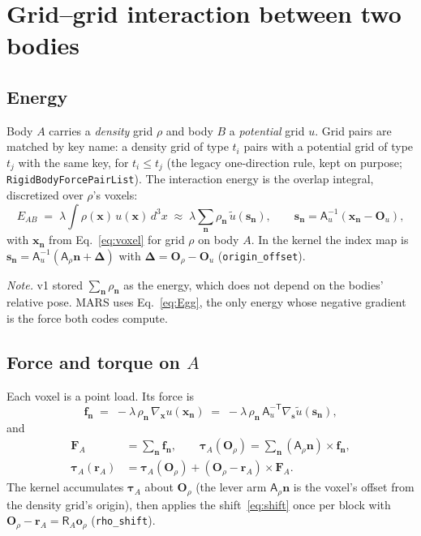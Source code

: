 \documentclass[11pt]{article}
\newcommand{\vb}[1]{\bm{#1}}
\newcommand{\code}[1]{\texttt{#1}}
\begin{document}
\section{Grid--grid interaction between two bodies}
\label{sec:gridgrid}

\subsection{Energy}

Body $A$ carries a \emph{density} grid $\rho$ and body $B$ a \emph{potential}
grid $u$. Grid pairs are matched by key name: a density grid of type $t_i$
pairs with a potential grid of type $t_j$ with the same key, for $t_i\le t_j$
(the legacy one-direction rule, kept on purpose; \code{RigidBodyForcePairList}).
The interaction energy is the overlap integral, discretized over $\rho$'s
voxels:
\begin{equation}
  E_{AB} \;=\; \lambda\int \rho(\vb x)\,u(\vb x)\,d^3x
  \;\approx\; \lambda\sum_{\vb n}\rho_{\vb n}\,
  \tilde u\!\left(\vb s_{\vb n}\right),
  \qquad
  \vb s_{\vb n} = \mathsf A_u^{-1}\!\left(\vb x_{\vb n}-\vb O_u\right),
  \label{eq:Egg}
\end{equation}
with $\vb x_{\vb n}$ from Eq.~\eqref{eq:voxel} for grid $\rho$ on body $A$. In
the kernel the index map is
$\vb s_{\vb n} = \mathsf A_u^{-1}\left(\mathsf A_\rho\vb n + \vb\Delta\right)$
with $\vb\Delta=\vb O_\rho-\vb O_u$ (\code{origin\_offset}).

\emph{Note.} v1 stored $\sum_{\vb n}\rho_{\vb n}$ as the energy, which does
not depend on the bodies' relative pose. MARS uses Eq.~\eqref{eq:Egg}, the only
energy whose negative gradient is the force both codes compute.

\subsection{\texorpdfstring{Force and torque on $A$}{Force and torque on A}}

Each voxel is a point load. Its force is
\begin{equation}
  \vb f_{\vb n} \;=\; -\lambda\,\rho_{\vb n}\,\nabla_{\vb x}u(\vb x_{\vb n})
  \;=\; -\lambda\,\rho_{\vb n}\,\mathsf A_u^{-\mathsf T}\nabla_{\vb s}\tilde u(\vb s_{\vb n}),
\end{equation}
and
\begin{equation}
  \begin{aligned}
  \vb F_A&=\sum_{\vb n}\vb f_{\vb n},\qquad
  \vb\tau_A(\vb O_\rho)=\sum_{\vb n}\left(\mathsf A_\rho\vb n\right)\times\vb f_{\vb n},\\
  \vb\tau_A(\vb r_A)&=\vb\tau_A(\vb O_\rho)+(\vb O_\rho-\vb r_A)\times\vb F_A .
  \end{aligned}
  \label{eq:FA}
\end{equation}
The kernel accumulates $\vb\tau_A$ about $\vb O_\rho$ (the lever arm
$\mathsf A_\rho\vb n$ is the voxel's offset from the density grid's origin),
then applies the shift~\eqref{eq:shift} once per block with
$\vb O_\rho-\vb r_A=\mathsf R_A\vb o_\rho$ (\code{rho\_shift}).
\end{document}
